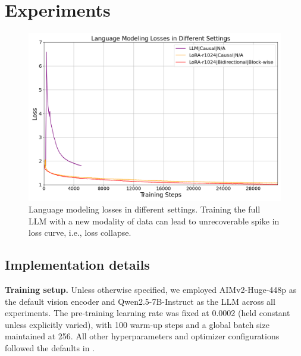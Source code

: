 \section{Experiments}
\label{sec:experiments}
\begin{figure}
    \centering
    \includegraphics[width=\linewidth]{images/loss_curves_full_llm.png}
    \caption{Language modeling losses in different settings. Training the full LLM with a new modality of data can lead to unrecoverable spike in loss curve, i.e., loss collapse.}
    \label{fig:full_llm}
\end{figure}
\subsection{Implementation details}
\textbf{Training setup.}
Unless otherwise specified, we employed AIMv2-Huge-448p \cite{aimv2} as the default vision encoder and Qwen2.5-7B-Instruct \cite{qwen2.5} as the LLM across all experiments. The pre-training learning rate was fixed at 0.0002 (held constant unless explicitly varied), with 100 warm-up steps and a global batch size maintained at 256. All other hyperparameters and optimizer configurations followed the defaults in \cite{llava1_5}. 

